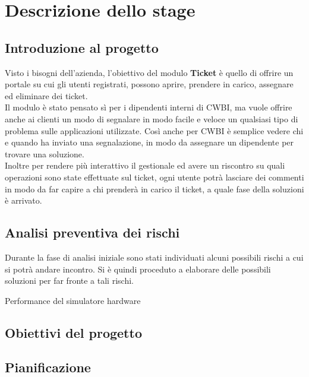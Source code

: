\chapter{Descrizione dello stage}
\label{cap:descrizione-stage}

\section{Introduzione al progetto}
Visto i bisogni dell'azienda, l'obiettivo del modulo \textbf{Ticket} è quello di offrire un portale su cui gli utenti registrati, possono aprire, prendere in carico, assegnare ed eliminare dei ticket. \\
Il modulo è stato pensato sì per i dipendenti interni di CWBI, ma vuole offrire anche ai clienti un modo di segnalare in modo facile e veloce un qualsiasi tipo di problema sulle applicazioni utilizzate. Così anche per CWBI è semplice vedere chi e quando ha inviato una segnalazione, in modo da assegnare un dipendente per trovare una soluzione.\\ 
Inoltre per rendere più interattivo il gestionale ed avere un riscontro su quali operazioni sono state effettuate sul ticket, ogni utente potrà lasciare dei commenti in modo da far capire a chi prenderà in carico il ticket, a quale fase della soluzioni è arrivato.
\section{Analisi preventiva dei rischi}

Durante la fase di analisi iniziale sono stati individuati alcuni possibili rischi a cui si potrà andare incontro.
Si è quindi proceduto a elaborare delle possibili soluzioni per far fronte a tali rischi.\\

\begin{risk}{Performance del simulatore hardware}
    \label{risk:hardware-simulator} 
\end{risk}

\section{Obiettivi del progetto}


\section{Pianificazione}
